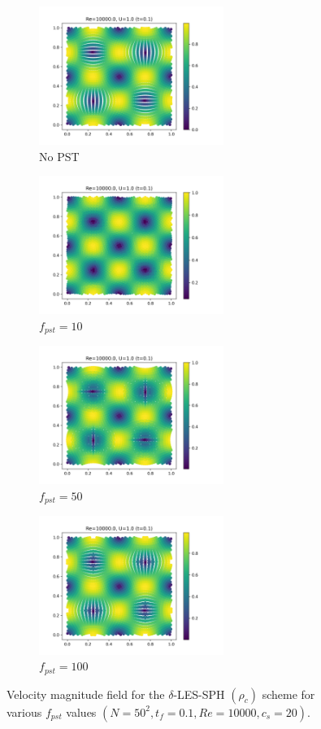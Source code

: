 \begin{figure}[H]
  \begin{subfigure}{7cm}
    \centering\includegraphics[width=6cm]{Code-Figures/deltales/pst/c0_20_tait_pec_dtmul_1_nx_50_pst_-1_re_10000_deltales/final_vmag.png}
    \caption{No PST}
  \end{subfigure}
  \begin{subfigure}{7cm}
    \centering\includegraphics[width=6cm]{Code-Figures/deltales/pst/c0_20_tait_pec_dtmul_1_nx_50_pst_10_re_10000_deltales/final_vmag.png}
    \caption{$f_{pst} = 10$}
  \end{subfigure}
  \begin{subfigure}{7cm}
    \centering\includegraphics[width=6cm]{Code-Figures/deltales/pst/c0_20_tait_pec_dtmul_1_nx_50_pst_50_re_10000_deltales/final_vmag.png}
    \caption{$f_{pst} = 50$}
  \end{subfigure}
  \begin{subfigure}{7cm}
    \centering\includegraphics[width=6cm]{Code-Figures/deltales/pst/c0_20_tait_pec_dtmul_1_nx_50_pst_100_re_10000_deltales/final_vmag.png}
    \caption{$f_{pst} = 100$}
  \end{subfigure}
  \caption{Velocity magnitude field for the $\delta$-LES-SPH $(\rho_c)$ scheme for various $f_{pst}$ values $(N=50^2, t_f=0.1, Re=10000, c_s=20)$.}
  \label{fig:deltales-pst-vmag}
\end{figure}

